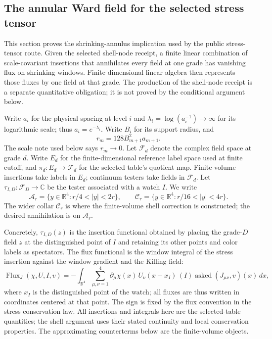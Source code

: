\subsection{The annular Ward field for the selected stress tensor}
\label{sec:ex-lattice-actual-stress-annulus}

This section proves the shrinking-annulus implication used by the public
stress-tensor route.  Given the selected shell-node receipt, a finite linear
combination of scale-covariant insertions that annihilates every field at one
grade has vanishing flux on shrinking windows.  Finite-dimensional linear
algebra then represents those fluxes by one field at that grade.  The
production of the shell-node receipt is a separate quantitative obligation;
it is not proved by the conditional argument below.

Write $a_i$ for the physical spacing at level $i$ and
$\lambda_i=\log(a_i^{-1})\to\infty$ for its logarithmic scale; thus
$a_i=e^{-\lambda_i}$.  Write $B_i$ for its support radius, and
\[
  r_m=128 B_{m+1}^{2}a_{m+1}.
\]
The scale note used below says $r_m\to0$.  Let $\mathcal F_d$ denote the
complex field space at grade $d$. Write $E_d$ for the finite-dimensional
reference label space used at finite cutoff, and
$\pi_d:E_d\to\mathcal F_d$ for the selected table's quotient map.
Finite-volume insertions take labels in $E_d$; continuum testers take
fields in $\mathcal F_d$. Let $\tau_{I,D}:\mathcal F_D\to\mathbb C$
be the tester associated with a watch $I$.  We write
\[
  \mathcal A_r=\{y\in\mathbb R^4:r/4<|y|<2r\},\qquad
  \mathcal C_r=\{y\in\mathbb R^4:r/16<|y|<4r\}.
\]
The wider collar $\mathcal C_r$ is where the finite-volume shell correction is
constructed; the desired annihilation is on $\mathcal A_r$.

Concretely, $\tau_{I,D}(z)$ is the insertion functional obtained by placing
the grade-$D$ field $z$ at the distinguished point of $I$ and retaining its
other points and color labels as spectators.  The flux functional is the
window integral of the stress insertion against the window gradient and the
Killing field:
\[
 \operatorname{Flux}_{J}(\chi,U,I,v)
 =-\int_{\mathbb R^4}\sum_{\mu,\nu=1}^4
   \partial_\mu\chi(x)\,U_\nu(x-x_I)\,
   (I)\!\operatorname{asked}(J_{\mu\nu},v)(x)\,dx,
\]
where $x_I$ is the distinguished point of the watch; all fluxes are thus
written in coordinates centered at that point.  The sign is fixed by the
flux convention in the stress conservation law.
All insertions and integrals here are the selected-table quantities; the
shell argument uses their stated continuity and local conservation
properties.  The approximating counterterms below are the finite-volume
objects.

